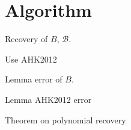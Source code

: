 \section{Algorithm}
\label{sec:algo}

Recovery of $B$, $\mathcal{B}$.

Use AHK2012

Lemma error of $B$.

Lemma AHK2012 error

Theorem on polynomial recovery


